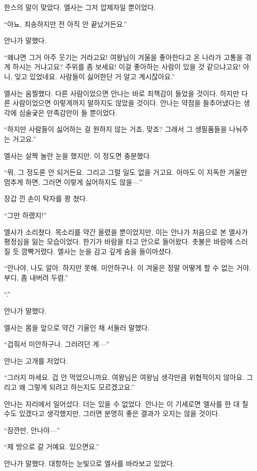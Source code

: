 한스의 말이 맞았다. 엘사는 그저 압제자일 뿐이었다.

``아뇨, 죄송하지만 전 아직 안 끝났거든요.''

안나가 말했다.

``왜냐면 그거 아주 웃기는 거라고요! 여왕님이 겨울을 좋아한다고 온 나라가 고통을 겪게 하시는 거냐고요? 주위를 좀 보세요! 이걸 좋아하는 사람이 있을 것 같으냐고요! 아니, 잊고 있었네요. 사람들이 싫어한단 거 알고 계시잖아요.''

엘사는 움찔했다. 다른 사람이었으면 안나는 바로 죄책감이 들었을 것이다. 하지만 다른 사람이었으면 이렇게까지 말하지도 않았을 것이다. 안나는 약점을 들추어냈다는 생각에 심술궂은 만족감만이 들 뿐이었다.

``하지만 사람들이 싫어하는 걸 원하지 않는 거죠, 맞죠? 그래서 그 생필품들을 나눠주는 거고요.''

엘사는 살짝 놀란 눈을 했지만, 이 정도면 충분했다.

``뭐, 그 정도론 안 되거든요. 그리고 그럴 일도 없을 거고요. 아마도 이 지독한 겨울만 멈추게 하면, 그러면 이렇게 싫어하지도 않을—''

장갑 낀 손이 탁자를 쾅 쳤다.

``그만 하랬지!''

엘사가 소리쳤다. 목소리를 약간 올렸을 뿐이었지만, 이는 안나가 처음으로 본 엘사가 평정심을 잃는 모습이었다. 한기가 바람을 타고 안으로 들어왔다. 촛불은 바람에 스러질 듯 깜빡거렸다. 엘사는 눈을 감고 깊게 숨을 들이마셨다.

``안나야, 나도 알아. 하지만 못해. 미안하구나. 이 겨울은 정말 어떻게 할 수 없는 거야. 부디, 좀 내버려 두렴.''

``.''

안나가 말했다.

엘사는 몸을 앞으로 약간 기울인 채 서둘러 말했다.

``겁줘서 미안하구나. 그러려던 게—''

안나는 고개를 저었다.

``그러지 마세요. 겁 안 먹었으니까요. 여왕님은 여왕님 생각만큼 위협적이지 않아요. 그리고 왜 그렇게 되려고 하는지도 모르겠고요.''

안나는 자리에서 일어섰다. 더는 있을 수 없었다. 안나는 이 기세로면 엘사를 한 대 칠 수도 있겠다고 생각했지만, 그러면 분명히 좋은 결과가 오지는 않을 것이다.

``잠깐만, 안나야—''

``제 방으로 갈 거예요. 있으면요.''

안나가 말했다. 대항하는 눈빛으로 엘사를 바라보고 있었다.

